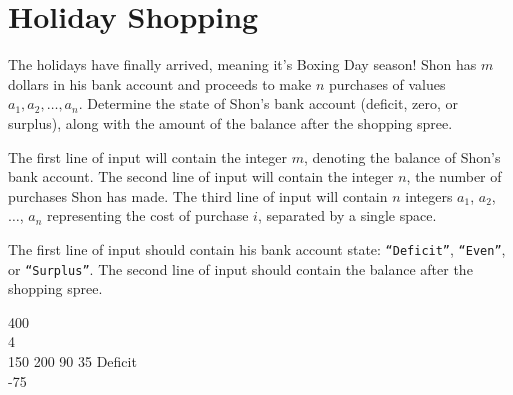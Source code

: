 \section{Holiday Shopping}
The holidays have finally arrived, meaning it's Boxing Day season! Shon has $m$ dollars in his bank account and proceeds to make $n$ purchases of values $a_1, a_2, \dots, a_n$. Determine the state of Shon's bank account (deficit, zero, or surplus), along with the amount of the balance after the shopping spree.

The first line of input will contain the integer $m$, denoting the balance of Shon's bank account. The second line of input will contain the integer $n$, the number of purchases Shon has made. The third line of input will contain $n$ integers $a_1$, $a_2$, $\dots$, $a_n$ representing the cost of purchase $i$, separated by a single space.

\outputformat
The first line of input should contain his bank account state: \texttt{``Deficit''}, \texttt{``Even''}, or \texttt{``Surplus''}. The second line of input should contain the balance after the shopping spree.

\addsample
{
400 \\
4 \\
150 200 90 35
}
{
Deficit \\
-75
}
